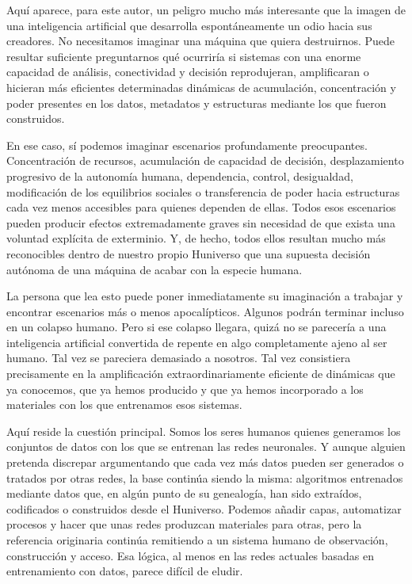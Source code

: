\documentclass[12pt,a4paper]{article}
\begin{document}
Aquí aparece, para este autor, un peligro mucho más interesante que la imagen de una inteligencia artificial que desarrolla espontáneamente un odio hacia sus creadores. No necesitamos imaginar una máquina que quiera destruirnos. Puede resultar suficiente preguntarnos qué ocurriría si sistemas con una enorme capacidad de análisis, conectividad y decisión reprodujeran, amplificaran o hicieran más eficientes determinadas dinámicas de acumulación, concentración y poder presentes en los datos, metadatos y estructuras mediante los que fueron construidos.

En ese caso, sí podemos imaginar escenarios profundamente preocupantes. Concentración de recursos, acumulación de capacidad de decisión, desplazamiento progresivo de la autonomía humana, dependencia, control, desigualdad, modificación de los equilibrios sociales o transferencia de poder hacia estructuras cada vez menos accesibles para quienes dependen de ellas. Todos esos escenarios pueden producir efectos extremadamente graves sin necesidad de que exista una voluntad explícita de exterminio. Y, de hecho, todos ellos resultan mucho más reconocibles dentro de nuestro propio Huniverso que una supuesta decisión autónoma de una máquina de acabar con la especie humana.

La persona que lea esto puede poner inmediatamente su imaginación a trabajar y encontrar escenarios más o menos apocalípticos. Algunos podrán terminar incluso en un colapso humano. Pero si ese colapso llegara, quizá no se parecería a una inteligencia artificial convertida de repente en algo completamente ajeno al ser humano. Tal vez se pareciera demasiado a nosotros. Tal vez consistiera precisamente en la amplificación extraordinariamente eficiente de dinámicas que ya conocemos, que ya hemos producido y que ya hemos incorporado a los materiales con los que entrenamos esos sistemas.

Aquí reside la cuestión principal. Somos los seres humanos quienes generamos los conjuntos de datos con los que se entrenan las redes neuronales. Y aunque alguien pretenda discrepar argumentando que cada vez más datos pueden ser generados o tratados por otras redes, la base continúa siendo la misma: algoritmos entrenados mediante datos que, en algún punto de su genealogía, han sido extraídos, codificados o construidos desde el Huniverso. Podemos añadir capas, automatizar procesos y hacer que unas redes produzcan materiales para otras, pero la referencia originaria continúa remitiendo a un sistema humano de observación, construcción y acceso. Esa lógica, al menos en las redes actuales basadas en entrenamiento con datos, parece difícil de eludir.
\end{document}
